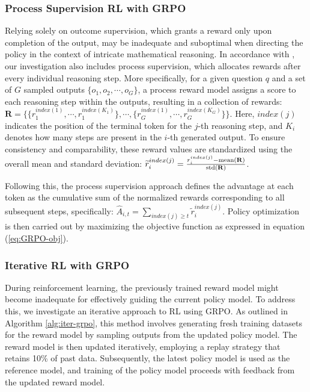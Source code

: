 \begin{itemize}[topsep=0pt]
\begin{itemize}[topsep=0pt]
\subsubsection{Process Supervision RL with GRPO}
Relying solely on outcome supervision, which grants a reward only upon completion of the output, may be inadequate and suboptimal when directing the policy in the context of intricate mathematical reasoning. In accordance with \cite{wang2023math}, our investigation also includes process supervision, which allocates rewards after every individual reasoning step. More specifically, for a given question $q$ and a set of $G$ sampled outputs $\{o_1, o_2, \cdots, o_G\}$, a process reward model assigns a score to each reasoning step within the outputs, resulting in a collection of rewards: $\mathbf{R} = \{ \{r_1^{index(1)},\cdots,r_1^{index(K_1)}\}, \cdots,  \{r_G^{index(1)},\cdots,r_G^{index(K_G)}\} \}$. Here, $index(j)$ indicates the position of the terminal token for the $j$-th reasoning step, and $K_i$ denotes how many steps are present in the $i$-th generated output. To ensure consistency and comparability, these reward values are standardized using the overall mean and standard deviation: $\widetilde{r}_i^{index(j)} = \frac{r_i^{index(j)} - {\rm mean(\mathbf{R})}}{{\rm std(\mathbf{R})}}$.

Following this, the process supervision approach defines the advantage at each token as the cumulative sum of the normalized rewards corresponding to all subsequent steps, specifically: $\hat{A}_{i, t} = \sum_{index(j) \ge t} \widetilde{r}_i^{index(j)}$.
Policy optimization is then carried out by maximizing the objective function as expressed in equation (\ref{eq:GRPO-obj}).

\subsubsection{Iterative RL with GRPO} During reinforcement learning, the previously trained reward model might become inadequate for effectively guiding the current policy model. To address this, we investigate an iterative approach to RL using GRPO. As outlined in Algorithm \ref{alg:iter-grpo}, this method involves generating fresh training datasets for the reward model by sampling outputs from the updated policy model. The reward model is then updated iteratively, employing a replay strategy that retains 10\% of past data. Subsequently, the latest policy model is used as the reference model, and training of the policy model proceeds with feedback from the updated reward model.


\end{itemize}
\end{itemize}
